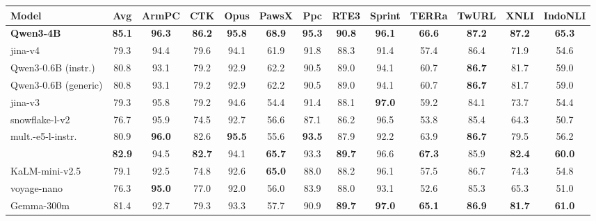 \documentclass[11pt]{article}
\begin{document}
\begin{table}[H]
\begin{tabular}{l*{12}{c}}
\toprule
\textbf{Model} & \textbf{Avg} & \textbf{ArmPC} & \textbf{CTK} & \textbf{Opus} & \textbf{PawsX} & \textbf{Ppc} & \textbf{RTE3} & \textbf{Sprint} & \textbf{TERRa} & \textbf{TwURL} & \textbf{XNLI} & \textbf{IndoNLI} \\
\midrule
\textbf{Qwen3-4B} & \textbf{85.1} & \textbf{96.3} & \textbf{86.2} & \textbf{95.8} & \textbf{68.9} & \textbf{95.3} & \textbf{90.8} & \textbf{96.1} & \textbf{66.6} & \textbf{87.2} & \textbf{87.2} & \textbf{65.3} \\
jina-v4 & 79.3 & 94.4 & 79.6 & 94.1 & 61.9 & 91.8 & 88.3 & 91.4 & 57.4 & 86.4 & 71.9 & 54.6 \\
\midrule
Qwen3-0.6B (instr.) & 80.8 & 93.1 & 79.2 & 92.9 & 62.2 & 90.5 & 89.0 & 94.1 & 60.7 & \textbf{86.7} & 81.7 & 59.0 \\
Qwen3-0.6B (generic) & 80.8 & 93.1 & 79.2 & 92.9 & 62.2 & 90.5 & 89.0 & 94.1 & 60.7 & \textbf{86.7} & 81.7 & 59.0 \\
jina-v3 & 79.3 & 95.8 & 79.2 & 94.6 & 54.4 & 91.4 & 88.1 & \textbf{97.0} & 59.2 & 84.1 & 73.7 & 54.4 \\
snowflake-l-v2 & 76.7 & 95.9 & 74.5 & 92.7 & 56.6 & 87.1 & 86.2 & 96.5 & 53.8 & 85.4 & 64.3 & 50.7 \\
mult.-e5-l-instr. & 80.9 & \textbf{96.0} & 82.6 & \textbf{95.5} & 55.6 & \textbf{93.5} & 87.9 & 92.2 & 63.9 & \textbf{86.7} & 79.5 & 56.2 \\
\textbf{\JEmbeddingVFiveTextSmallShort{}} & \textbf{82.9} & 94.5 & \textbf{82.7} & 94.1 & \textbf{65.7} & 93.3 & \textbf{89.7} & 96.6 & \textbf{67.3} & 85.9 & \textbf{82.4} & \textbf{60.0} \\
\midrule
KaLM-mini-v2.5 & 79.1 & 92.5 & 74.8 & 92.6 & \textbf{65.0} & 88.0 & 88.2 & 96.1 & 57.5 & 86.7 & 74.3 & 54.8 \\
voyage-nano & 76.3 & \textbf{95.0} & 77.0 & 92.0 & 56.0 & 83.9 & 88.0 & 93.1 & 52.6 & 85.3 & 65.3 & 51.0 \\
Gemma-300m & 81.4 & 92.7 & 79.3 & 93.3 & 57.7 & 90.9 & \textbf{89.7} & \textbf{97.0} & \textbf{65.1} & \textbf{86.9} & \textbf{81.7} & \textbf{61.0} \\

\end{tabular}
\end{table}
\end{document}
